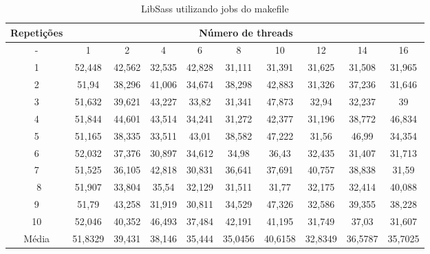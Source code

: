 \begin{table}[h]
\centering
\caption{LibSass utilizando jobs do makefile}
\label{tab:libsass}
\begin{tiny}
\begin{tabular}{cccccccccc}
\toprule
\textbf{Repetições} & \multicolumn{9}{c}{\textbf{Número de threads}} \\ \midrule
- & 1 & 2 & 4 & 6 & 8 & 10 & 12 & 14 & 16 \\ 
1 & 52,448   & 42,562   & 32,535   & 42,828   & 31,111  & 31,391  & 31,625  & 31,508  & 31,965 \\ 
2 & 51,94    & 38,296   & 41,006   & 34,674   & 38,298  & 42,883  & 31,326  & 37,236  & 31,646 \\ 
3 & 51,632   & 39,621   & 43,227   & 33,82    & 31,341  & 47,873  & 32,94   & 32,237  & 39 \\ 
4 & 51,844   & 44,601   & 43,514   & 34,241   & 31,272  & 42,377  & 31,196  & 38,772  & 46,834 \\ 
5 & 51,165   & 38,335   & 33,511   & 43,01    & 38,582  & 47,222  & 31,56   & 46,99   & 34,354 \\ 
6 & 52,032   & 37,376   & 30,897   & 34,612   & 34,98   & 36,43   & 32,435  & 31,407  & 31,713 \\ 
7 & 51,525   & 36,105   & 42,818   & 30,831   & 36,641  & 37,691  & 40,757  & 38,838  & 31,59 \\ \
8 & 51,907   & 33,804   & 35,54    & 32,129   & 31,511  & 31,77   & 32,175  & 32,414  & 40,088 \\ 
9 & 51,79    & 43,258   & 31,919   & 30,811   & 34,529  & 47,326  & 32,586  & 39,355  & 38,228 \\ 
10& 52,046   & 40,352   & 46,493   & 37,484   & 42,191  & 41,195  & 31,749  & 37,03   & 31,607 \\ \midrule 
Média& 51,8329  & 39,431   & 38,146   & 35,444   & 35,0456 & 40,6158 & 32,8349 & 36,5787 & 35,7025 \\ \bottomrule
\end{tabular}
\end{tiny}
\end{table}

